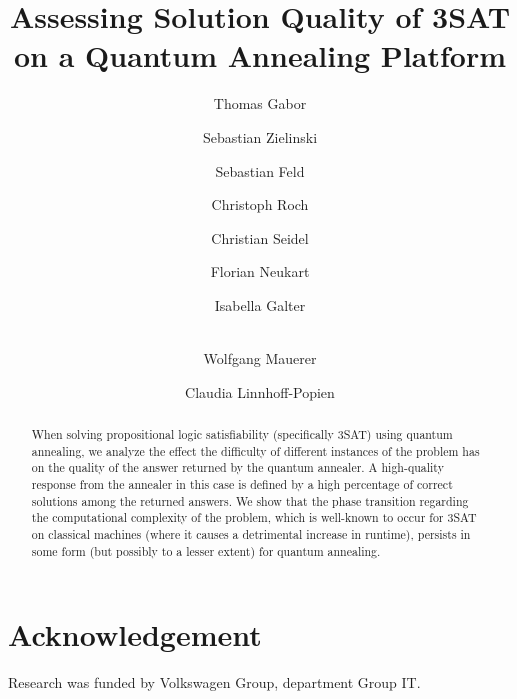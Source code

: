 \documentclass[runningheads]{llncs}
\begin{document}
%
\title{Assessing Solution Quality of 3SAT\\on a Quantum Annealing Platform}
%
%
\author{Thomas Gabor \and
Sebastian Zielinski \and
Sebastian Feld \and
Christoph Roch \and
Christian Seidel \and
Florian Neukart \and
Isabella Galter \and\\
Wolfgang Mauerer \and
Claudia Linnhoff-Popien}
%
%
%
\maketitle              %
%
\begin{abstract}
When solving propositional logic satisfiability (specifically 3SAT) using quantum annealing, we analyze the effect the difficulty of different instances of the problem has on the quality of the answer returned by the quantum annealer. A high-quality response from the annealer in this case is defined by a high percentage of correct solutions among the returned answers. We show that the phase transition regarding the computational complexity of the problem, which is well-known to occur for 3SAT on classical machines (where it causes a detrimental increase in runtime), persists in some form (but possibly to a lesser extent) for quantum annealing.

\end{abstract}
%
%
%







\section*{Acknowledgement}
Research was funded by Volkswagen Group, department Group IT. 
%
%
%


%
\end{document}
